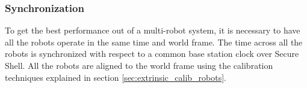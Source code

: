 \documentclass[10pt,twocolumn,letterpaper]{article}
\begin{document}
\subsubsection{Synchronization}
To get the best performance out of a multi-robot system, it is necessary to have all the robots operate in the same time and world frame. The time across all the robots is synchronized with respect to a common base station clock over Secure Shell. All the robots are aligned to the world frame using the calibration techniques explained in section \ref{sec:extrinsic_calib_robots}.



\end{document}
